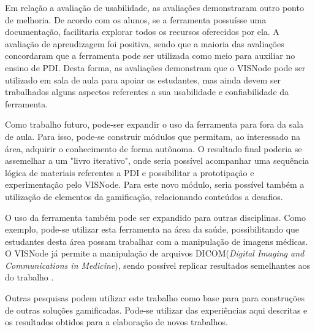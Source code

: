 \documentclass[
	12pt,				%
	oneside,			%
	a4paper,			%
	english,			%
	french,				%
	spanish,			%
	brazil,				%
	]{abntex2}
\begin{document}
Em relação a avaliação de usabilidade, as avaliações demonstraram outro ponto de melhoria. De acordo com os alunos, se a ferramenta possuísse uma documentação, facilitaria explorar todos os recursos oferecidos por ela. A avaliação de aprendizagem foi positiva, sendo que a maioria das avaliações concordaram que a ferramenta pode ser utilizada como meio para auxiliar no ensino de PDI. Desta forma, as avaliações demonstram que o VISNode pode ser utilizado em sala de aula para apoiar os estudantes, mas ainda devem ser trabalhados alguns aspectos referentes a sua usabilidade e confiabilidade da ferramenta.

Como trabalho futuro, pode-ser expandir o uso da ferramenta para fora da sala de aula. Para isso, pode-se construir módulos que permitam, ao interessado na área, adquirir o conhecimento de forma autônoma. O resultado final poderia se assemelhar a um "livro iterativo", onde seria possível acompanhar uma sequência lógica de materiais referentes a PDI e possibilitar a prototipação e experimentação pelo VISNode. Para este novo módulo, seria possível também a utilização de elementos da gamificação, relacionando conteúdos a desafios.

O uso da ferramenta também pode ser expandido para outras disciplinas. Como exemplo, pode-se utilizar esta ferramenta na área da saúde, possibilitando que estudantes desta área possam trabalhar com a manipulação de imagens médicas. O VISNode já permite a manipulação de arquivos DICOM(\textit{Digital Imaging and Communications in Medicine}), sendo possível replicar resultados semelhantes aos do trabalho \citet{ronnau2015}.

Outras pesquisas podem utilizar este trabalho como base para para construções de outras soluções gamificadas. Pode-se utilizar das experiências aqui descritas e os resultados obtidos para a elaboração de novos trabalhos.

\postextual





\end{document}
